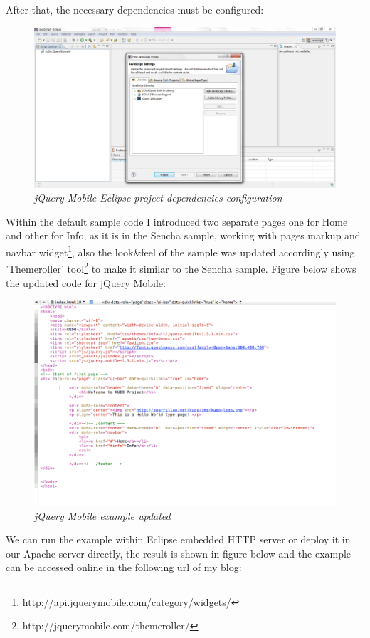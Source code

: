 \documentclass[a4paper,12pt]{book}
\begin{document}
After that, the necessary dependencies must be configured:

\begin{figure}[H]
    \centering
    \includegraphics[width=12cm, keepaspectratio]{img/jquery4.png}
    \caption{\textit{jQuery Mobile Eclipse project dependencies configuration}}
 \end{figure}

Within the default sample code I introduced two separate pages one for Home and other for Info, as it is in the Sencha sample, working with pages markup and navbar widget\footnote{http://api.jquerymobile.com/category/widgets/}, also the look\&feel of the sample was updated accordingly using 'Themeroller' tool\footnote{http://jquerymobile.com/themeroller/} to make it similar to the Sencha sample. Figure below shows the updated code for jQuery Mobile:

\begin{figure}[H]
    \centering
    \includegraphics[width=12cm, keepaspectratio]{img/jquery2.png}
    \caption{\textit{jQuery Mobile example updated}}
 \end{figure}

We can run the example within Eclipse embedded HTTP server or deploy it in our Apache server directly, the result is shown in figure below and the example can be accessed online in the following url of my blog:\\ 
\end{document}
